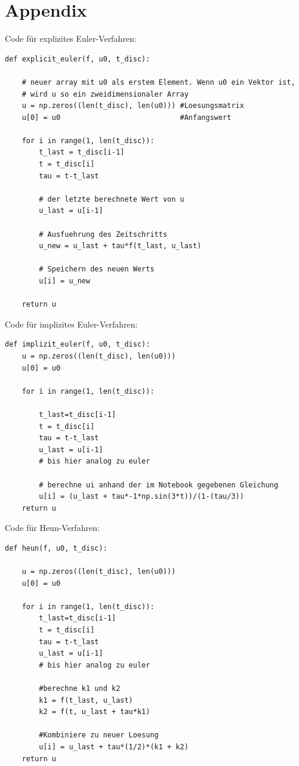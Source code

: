 \documentclass[german]{uebung}
\begin{document}
\section*{Appendix}\label{lab:ap}
\label{codeA}Code f\"ur explizites Euler-Verfahren:
\begin{lstlisting}[frame=single]
def explicit_euler(f, u0, t_disc):
    
    # neuer array mit u0 als erstem Element. Wenn u0 ein Vektor ist,
    # wird u so ein zweidimensionaler Array
    u = np.zeros((len(t_disc), len(u0))) #Loesungsmatrix
    u[0] = u0                            #Anfangswert
    
    for i in range(1, len(t_disc)):
        t_last = t_disc[i-1]
        t = t_disc[i]
        tau = t-t_last
        
        # der letzte berechnete Wert von u
        u_last = u[i-1]
        
        # Ausfuehrung des Zeitschritts
        u_new = u_last + tau*f(t_last, u_last)
                        
        # Speichern des neuen Werts
        u[i] = u_new
    
    return u
\end{lstlisting}
\;\newline
\label{codeB}Code f\"ur implizites Euler-Verfahren:
\begin{lstlisting}[frame=single]
def implizit_euler(f, u0, t_disc):
    u = np.zeros((len(t_disc), len(u0)))
    u[0] = u0
    
    for i in range(1, len(t_disc)):

        t_last=t_disc[i-1]
        t = t_disc[i]
        tau = t-t_last
        u_last = u[i-1]
        # bis hier analog zu euler
        
        # berechne ui anhand der im Notebook gegebenen Gleichung
        u[i] = (u_last + tau*-1*np.sin(3*t))/(1-(tau/3))
    return u
\end{lstlisting}
\newpage
\;\newline
\label{codeC}Code f\"ur Heun-Verfahren:
\begin{lstlisting}[frame=single]
def heun(f, u0, t_disc):
    
    u = np.zeros((len(t_disc), len(u0)))
    u[0] = u0
    
    for i in range(1, len(t_disc)):
        t_last=t_disc[i-1]
        t = t_disc[i]
        tau = t-t_last
        u_last = u[i-1]
        # bis hier analog zu euler
        
        #berechne k1 und k2
        k1 = f(t_last, u_last)
        k2 = f(t, u_last + tau*k1)
        
        #Kombiniere zu neuer Loesung
        u[i] = u_last + tau*(1/2)*(k1 + k2)
    return u
\end{lstlisting}
\end{document}
